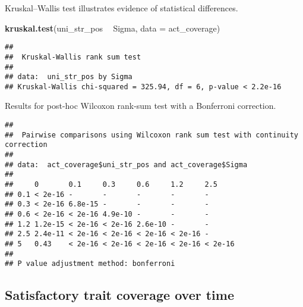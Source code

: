 \documentclass[]{book}
\newenvironment{Shaded}{\begin{snugshade}}{\end{snugshade}}
\newcommand{\DataTypeTok}[1]{\textcolor[rgb]{0.13,0.29,0.53}{#1}}
\newcommand{\KeywordTok}[1]{\textcolor[rgb]{0.13,0.29,0.53}{\textbf{#1}}}
\newcommand{\NormalTok}[1]{#1}
\newcommand{\OperatorTok}[1]{\textcolor[rgb]{0.81,0.36,0.00}{\textbf{#1}}}
\newcommand{\OtherTok}[1]{\textcolor[rgb]{0.56,0.35,0.01}{#1}}
\newcommand{\StringTok}[1]{\textcolor[rgb]{0.31,0.60,0.02}{#1}}
\begin{document}
Kruskal--Wallis test illustrates evidence of statistical differences.

\begin{Shaded}
\begin{Highlighting}[]
\KeywordTok{kruskal.test}\NormalTok{(uni_str_pos }\OperatorTok{~}\StringTok{ }\NormalTok{Sigma, }\DataTypeTok{data =}\NormalTok{ act_coverage)}
\end{Highlighting}
\end{Shaded}

\begin{verbatim}
## 
##  Kruskal-Wallis rank sum test
## 
## data:  uni_str_pos by Sigma
## Kruskal-Wallis chi-squared = 325.94, df = 6, p-value < 2.2e-16
\end{verbatim}

Results for post-hoc Wilcoxon rank-sum test with a Bonferroni correction.

\begin{Shaded}
\end{Shaded}

\begin{verbatim}
## 
##  Pairwise comparisons using Wilcoxon rank sum test with continuity correction 
## 
## data:  act_coverage$uni_str_pos and act_coverage$Sigma 
## 
##     0       0.1     0.3     0.6     1.2     2.5    
## 0.1 < 2e-16 -       -       -       -       -      
## 0.3 < 2e-16 6.8e-15 -       -       -       -      
## 0.6 < 2e-16 < 2e-16 4.9e-10 -       -       -      
## 1.2 1.2e-15 < 2e-16 < 2e-16 2.6e-10 -       -      
## 2.5 2.4e-11 < 2e-16 < 2e-16 < 2e-16 < 2e-16 -      
## 5   0.43    < 2e-16 < 2e-16 < 2e-16 < 2e-16 < 2e-16
## 
## P value adjustment method: bonferroni
\end{verbatim}

\hypertarget{satisfactory-trait-coverage-over-time-3}{%
\subsection{Satisfactory trait coverage over time}\label{satisfactory-trait-coverage-over-time-3}}
\end{document}

